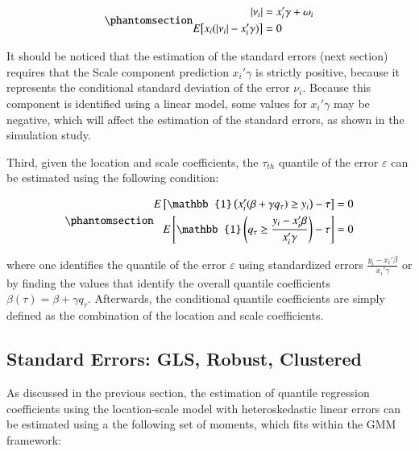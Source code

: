 \documentclass[
  authoryear,
  review,
  1p]{elsarticle}
\begin{document}
\begin{equation}\phantomsection\label{eq-eq8}{\begin{aligned}
  |\nu_i| &=x_i'\gamma+\omega_i \\
   E\big[ x_i (|\nu_i| -x_i'\gamma ) \big] &=0
  \end{aligned}
}\end{equation}

It should be noticed that the estimation of the standard errors (next
section) requires that the Scale component prediction \(x_i'\gamma\) is
strictly positive, because it represents the conditional standard
deviation of the error \(\nu_i\). Because this component is identified
using a linear model, some values for \(x_i'\gamma\) may be negative,
which will affect the estimation of the standard errors, as shown in the
simulation study.

Third, given the location and scale coefficients, the \(\tau_{th}\)
quantile of the error \(\varepsilon\) can be estimated using the
following condition:

\begin{equation}\phantomsection\label{eq-eq9}{\begin{aligned}
  E\left[  \mathbb{1}\left(x_i' (\beta +   \gamma q_\tau) \geq y_i \right) - \tau \right] &=0  \\
  E\left[  \mathbb{1}\left(   q_\tau \geq \frac{y_i-x_i'\beta}{x_i'\gamma} \right) - \tau \right] &=0  \\
  \end{aligned}
}\end{equation}

where one identifies the quantile of the error \(\varepsilon\) using
standardized errors \(\frac{y_i-x_i'\beta}{x_i'\gamma}\) or by finding
the values that identify the overall quantile coefficients
\(\beta(\tau)=\beta + \gamma q_\tau\). Afterwards, the conditional
quantile coefficients are simply defined as the combination of the
location and scale coefficients.

\subsection{Standard Errors: GLS, Robust, Clustered}\label{sec-se}

As discussed in the previous section, the estimation of quantile
regression coefficients using the location-scale model with
heteroskedastic linear errors can be estimated using a the following set
of moments, which fits within the GMM framework:
\end{document}

